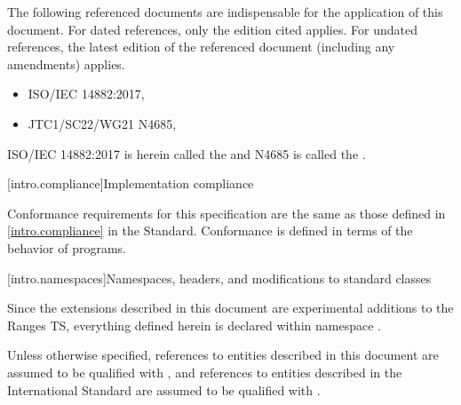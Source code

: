 \pnum
The following referenced documents are indispensable for the
application of this document. For dated references, only the
edition cited applies. For undated references, the latest edition
of the referenced document (including any amendments) applies.

\begin{itemize}
\item ISO/IEC 14882:2017, 
\item JTC1/SC22/WG21 N4685, 
\end{itemize}

ISO/IEC 14882:2017 is herein called the \defn{C\Rplus\Rplus\xspace Standard} and N4685 is called
the .

[intro.compliance]{Implementation compliance}

\pnum
Conformance requirements for this specification are the same as those
defined in \ref{intro.compliance} in the \Cpp Standard.
\enternote
Conformance is defined in terms of the behavior of programs.
\exitnote

[intro.namespaces]{Namespaces, headers, and modifications to standard classes}

\pnum
Since the extensions described in this document are experimental additions to the Ranges TS,
everything defined herein is declared within namespace .

\pnum
Unless otherwise specified, references to  entities described in this
document  are assumed to be qualified with , and
references to entities described in the International Standard are assumed to be
qualified with .
